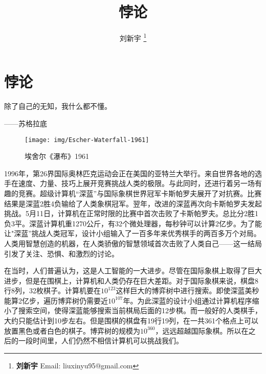 \documentclass[b5paper]{ctexart}
\begin{document}
\title{悖论}

\author{刘新宇
\thanks{{\bfseries 刘新宇} \newline
  Email: liuxinyu95@gmail.com \newline}
  }

\maketitle
\fi


\ifx\wholebook\relax
\chapter{悖论}
\fi

\epigraph{除了自己的无知，我什么都不懂。}{——苏格拉底}

\begin{figure}[htbp]
 \centering
 \texttt{[image: img/Escher-Waterfall-1961]}
 \caption{埃舍尔《瀑布》1961}
 \label{fig:Escher-Waterfall}
\end{figure}

1996年，第26界国际奥林匹克运动会正在美国的亚特兰大举行。来自世界各地的选手在速度、力量、技巧上展开竞赛挑战人类的极限。与此同时，还进行着另一场有趣的竞赛。超级计算机“深蓝”与国际象棋世界冠军卡斯帕罗夫展开了对抗赛。比赛结果是深蓝2胜4负输给了人类象棋冠军。翌年，改进的深蓝再次向卡斯帕罗夫发起挑战。5月11日，计算机在正常时限的比赛中首次击败了卡斯帕罗夫。总比分2胜1负3平。深蓝计算机重1270公斤，有32个微处理器，每秒钟可以计算2亿步。为了能让"深蓝”挑战人类冠军，设计小组输入了一百多年来优秀棋手的两百多万个对局。人类用智慧创造的机器，在人类骄傲的智慧领域首次击败了人类自己——这一结局引发了关注、恐惧、和激烈的讨论。

在当时，人们普遍认为，这是人工智能的一大进步。尽管在国际象棋上取得了巨大进步，但是在围棋上，计算机和人类仍存在巨大差距。对于国际象棋来说，棋盘8行8列，32枚棋子。计算机要在$10^{123}$这样巨大的博弈树中进行搜索。即使深蓝美秒能算2亿步，遍历博弈树仍需要近$10^{107}$年。为此深蓝的设计小组通过计算机程序缩小了搜索空间，使得深蓝能够搜索当前棋局后面的12步棋。而一般好的人类棋手，大约只能估计到10步左右。但是围棋的棋盘有19行19列，在一共361个格点上可以放置黑色或者白色的棋子。博弈树的规模为$10^{360}$，远远超越国际象棋。所以在之后的一段时间里，人们仍然不相信计算机可以挑战我们。
\end{document}
